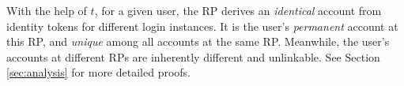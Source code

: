 %
%

With the help of $t$, for a given user, the RP derives an \emph{identical} account from identity tokens for different login instances.
It is the user's \emph{permanent} account at this RP,
    and \emph{unique} among all accounts at the same RP.
Meanwhile, the user's accounts at different RPs are inherently different and unlinkable.
See Section \ref{sec:analysis} for more detailed proofs.


